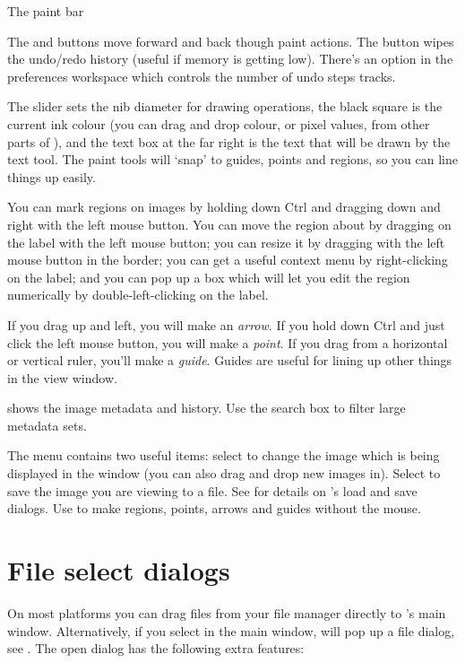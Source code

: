 \begin{fig2}
\caption{The paint bar}
\end{fig2}

The  and  buttons move forward and back though paint
actions. The  button wipes the undo/redo history (useful if memory
is getting low). There's an option in the preferences workspace which controls
the number of undo steps \nip{} tracks.

The slider sets the nib diameter for drawing operations, the black square is
the current ink colour (you can drag and drop colour, or pixel values, from 
other parts of ), and the text box at the far right is the text that
will be drawn by the text tool. The paint tools will `snap' to guides, points
and regions, so you can line things up easily. 

You can mark regions on images by holding down Ctrl and dragging down and
right with the left mouse button.  You can move the region about by dragging
on the label with the left mouse button; you can resize it by dragging with
the left mouse button in the border; you can get a useful context menu by
right-clicking on the label; and you can pop up a box which will let you
edit the region numerically by double-left-clicking on the label.  

If you drag up and left, you will make an \emph{arrow}.  If you hold down Ctrl
and just click the left mouse button, you will make a \emph{point}. If you
drag from a horizontal or vertical ruler, you'll make a \emph{guide}. Guides
are useful for lining up other things in the view window.

 shows the image metadata and history. Use the
search box to filter large metadata sets. 

The  menu contains two useful items: select  to change the image which is being displayed in the window (you can
also drag and drop new images in). Select
 to save the image you are viewing to a file. See
 for details on \nip{}'s load and save dialogs. 
Use  to make regions, points, arrows and guides without
the mouse.

\section{File select dialogs}

On most platforms you can drag files from your file manager directly to
\nip{}'s main window.  Alternatively, if you select 
in the main window, \nip{} will pop up a file dialog, see
. The open dialog has the following extra features:

